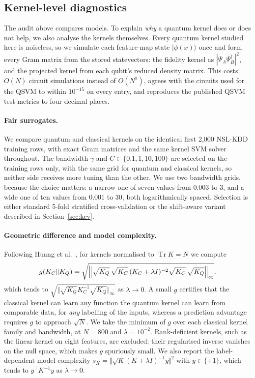 \subsection{Kernel-level diagnostics}\label{sec:kdiag}
The audit above compares models. To explain \emph{why} a quantum kernel does or does not help, we also
analyse the kernels themselves. Every quantum kernel studied here is noiseless, so we simulate each
feature-map state $|\phi(x)\rangle$ once and form every Gram matrix from the stored statevectors: the
fidelity kernel as $|\Psi_A\Psi_B^{\dagger}|^{2}$, and the projected kernel from each qubit's reduced
density matrix. This costs $O(N)$ circuit simulations instead of $O(N^{2})$, agrees with the circuits
used for the QSVM to within $10^{-15}$ on every entry, and reproduces the published QSVM test metrics to
four decimal places.

\paragraph{Fair surrogates.} We compare quantum and classical kernels on the identical first 2{,}000
NSL-KDD training rows, with exact Gram matrices and the same kernel SVM solver throughout. The bandwidth $\gamma$ and
$C\in\{0.1,1,10,100\}$ are selected on the training rows only, with the same grid for quantum and
classical kernels, so neither side receives more tuning than the other. We use two bandwidth grids,
because the choice matters: a narrow one of seven values from $0.003$ to $3$, and a wide one of ten
values from $0.001$ to $30$, both logarithmically spaced. Selection is either standard 5-fold
stratified cross-validation or the shift-aware variant described in Section~\ref{sec:kcv}.

\paragraph{Geometric difference and model complexity.} Following Huang et al.~\cite{huang2021power}, for
kernels normalised to $\operatorname{Tr}K=N$ we compute
\[
g(K_C\Vert K_Q)=\sqrt{\Bigl\Vert\sqrt{K_Q}\,\sqrt{K_C}\,(K_C+\lambda I)^{-2}\sqrt{K_C}\,\sqrt{K_Q}\Bigr\Vert_{\infty}},
\]
which tends to $\sqrt{\Vert\sqrt{K_Q}K_C^{-1}\sqrt{K_Q}\Vert_{\infty}}$ as $\lambda\to 0$. A small $g$
certifies that the classical kernel can learn any function the quantum kernel can learn from comparable
data, for \emph{any} labelling of the inputs, whereas a prediction advantage requires $g$ to approach
$\sqrt{N}$. We take the minimum of $g$ over each classical kernel family and bandwidth, at $N=800$ and
$\lambda=10^{-2}$. Rank-deficient kernels, such as the linear kernel on eight features, are excluded:
their regularised inverse vanishes on the null space, which makes $g$ spuriously small. We also report
the label-dependent model complexity $s_K=\Vert\sqrt{K}(K+\lambda I)^{-1}y\Vert^{2}$ with $y\in\{\pm1\}$,
which tends to $y^{\top}K^{-1}y$ as $\lambda\to 0$.

